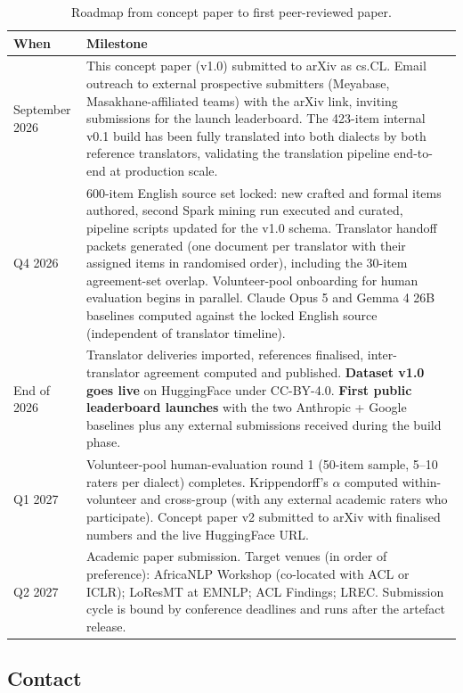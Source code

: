 \documentclass[11pt]{article}
\begin{document}
\begin{table}[t]
\centering
\small
\begin{tabular}{p{2.4cm}p{12cm}}
\toprule
\textbf{When} & \textbf{Milestone} \\
\midrule
September 2026 & This concept paper (v1.0) submitted to arXiv as cs.CL. Email outreach to external prospective submitters (Meyabase, Masakhane-affiliated teams) with the arXiv link, inviting submissions for the launch leaderboard. The 423-item internal v0.1 build has been fully translated into both dialects by both reference translators, validating the translation pipeline end-to-end at production scale. \\
Q4 2026 & 600-item English source set locked: new crafted and formal items authored, second Spark mining run executed and curated, pipeline scripts updated for the v1.0 schema. Translator handoff packets generated (one document per translator with their assigned items in randomised order), including the 30-item agreement-set overlap. Volunteer-pool onboarding for human evaluation begins in parallel. Claude Opus 5 and Gemma 4 26B baselines computed against the locked English source (independent of translator timeline). \\
End of 2026 & Translator deliveries imported, references finalised, inter-translator agreement computed and published. \textbf{Dataset v1.0 goes live} on HuggingFace under CC-BY-4.0. \textbf{First public leaderboard launches} with the two Anthropic + Google baselines plus any external submissions received during the build phase. \\
Q1 2027 & Volunteer-pool human-evaluation round 1 (50-item sample, 5--10 raters per dialect) completes. Krippendorff's $\alpha$ computed within-volunteer and cross-group (with any external academic raters who participate). Concept paper v2 submitted to arXiv with finalised numbers and the live HuggingFace URL. \\
Q2 2027 & Academic paper submission. Target venues (in order of preference): AfricaNLP Workshop (co-located with ACL or ICLR); LoResMT at EMNLP; ACL Findings; LREC. Submission cycle is bound by conference deadlines and runs after the artefact release. \\
\bottomrule
\end{tabular}
\caption{Roadmap from concept paper to first peer-reviewed paper.}
\label{tab:roadmap}
\end{table}

\subsection{Contact}
\end{document}
